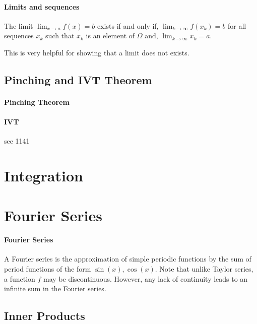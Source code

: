 \documentclass[12pt, letterpaper]{article}
\begin{document}
    \paragraph{Limits and sequences}
    The limit \(\lim_{x\to a} f(x) = b\) exists if and only if,
    \(\lim_{k\to\infty} f(x_k) = b\)  for all sequences \({x_k}\) such that 
    \(x_k\) is an element of \(\Omega\) and,
    \(\lim_{k\to\infty} x_k = a\).
    
    This is very helpful for showing that a limit does not exists.

    \subsection{Pinching and IVT Theorem}
    \paragraph{Pinching Theorem}
    \paragraph{IVT}
    see 1141
    
    
    
    




    
    

    \section{Integration}


    \section{Fourier Series}
    \paragraph{Fourier Series}
    A Fourier series is the approximation of simple periodic functions by
    the sum of period functions of the form \(\sin(x), \cos(x)\).
    Note that unlike Taylor series, a function \(f\) may be discontinuous.
    However, any lack of continuity leads to an infinite sum in the Fourier series.
    
    \subsection{Inner Products}
\end{document}
